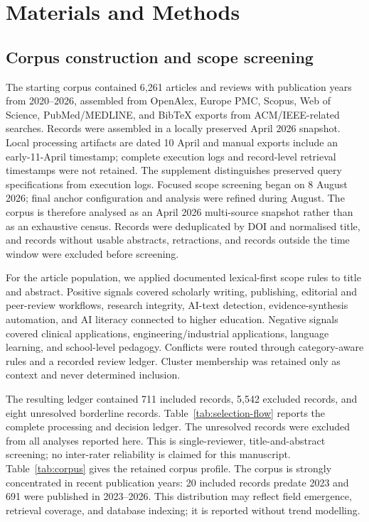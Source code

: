 \documentclass[a4paper,10pt,conference]{IEEEtran}
\begin{document}
\section{Materials and Methods}
\label{sec:methods}

\subsection{Corpus construction and scope screening}

The starting corpus contained 6,261 articles and reviews with publication years
from 2020--2026, assembled from OpenAlex, Europe PMC, Scopus, Web of Science,
PubMed/MEDLINE, and BibTeX exports from ACM/IEEE-related searches. Records were
assembled in a locally preserved April 2026 snapshot. Local processing artifacts
are dated 10 April and manual exports include an early-11-April timestamp;
complete execution logs and record-level retrieval timestamps were not retained.
The supplement distinguishes preserved query specifications from execution logs.
Focused scope screening began on 8 August 2026; final anchor configuration and
analysis were refined during August. The corpus is therefore analysed as an
April 2026 multi-source snapshot rather than as an exhaustive census. Records
were deduplicated by
DOI and normalised title, and records without usable abstracts, retractions,
and records outside the time window were excluded before screening.

For the article population, we applied documented lexical-first scope rules to
title and abstract. Positive signals covered scholarly writing, publishing,
editorial and peer-review workflows, research integrity, AI-text detection,
evidence-synthesis automation, and AI literacy connected to higher education.
Negative signals covered clinical applications, engineering/industrial
applications, language learning, and school-level pedagogy. Conflicts were
routed through category-aware rules and a recorded review ledger. Cluster
membership was retained only as context and never determined inclusion.

The resulting ledger contained 711 included records, 5,542 excluded records,
and eight unresolved borderline records. Table~\ref{tab:selection-flow}
reports the complete processing and decision ledger. The
unresolved records were excluded from all analyses reported here. This is
single-reviewer, title-and-abstract screening; no inter-rater reliability is
claimed for this manuscript. Table~\ref{tab:corpus} gives the retained
corpus profile. The corpus is strongly concentrated in recent
publication years: 20 included records predate 2023 and 691 were published in
2023--2026. This distribution may reflect field emergence, retrieval coverage,
and database indexing; it is reported without trend modelling.
\end{document}
